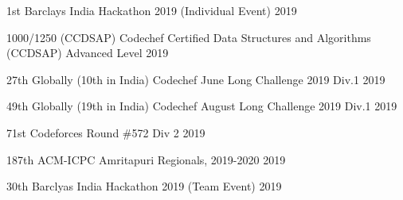 




\begin{cvhonors}


\cvhonor
{1st} %
{Barclays India Hackathon 2019 (Individual Event)} %
{} %
{2019} %


\cvhonor
{1000/1250 (CCDSAP)} %
{Codechef Certified Data Structures and Algorithms (CCDSAP) Advanced Level} %
{} %
{2019} %


\cvhonor
{27th Globally (10th in India)} %
{Codechef June Long Challenge 2019 Div.1} %
{} %
{2019} %


\cvhonor
{49th Globally (19th in India)} %
{Codechef August Long Challenge 2019 Div.1} %
{} %
{2019} %


\cvhonor
{71st} %
{Codeforces Round \#572 Div 2} %
{} %
{2019} %


\cvhonor
{187th} %
{ACM-ICPC Amritapuri Regionals, 2019-2020} %
{} %
{2019} %


\cvhonor
{30th} %
{Barclyas India Hackathon 2019 (Team Event)} %
{} %
{2019} %



\end{cvhonors}
